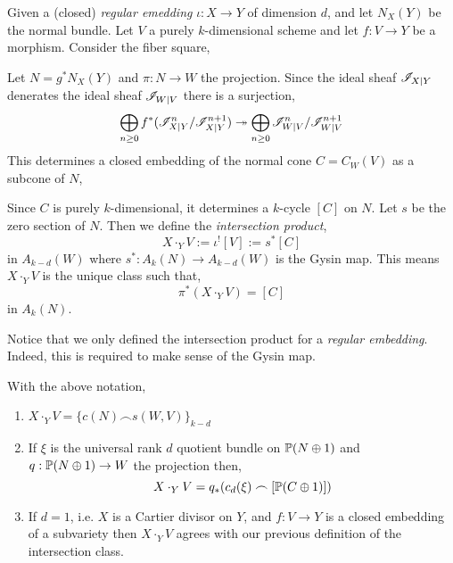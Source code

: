 \documentclass[12pt]{article}
\begin{document}
Given a (closed) \textit{regular emedding} $\iota : X \to Y$ of dimension $d$, and let $N_X(Y)$ be the normal bundle. Let $V$ a purely $k$-dimensional scheme and let $f : V \to Y$ be a morphism. Consider the fiber square,
\begin{center}
\end{center}
Let $N = g^* N_X(Y)$ and $\pi : N \to W$ the projection. Since the ideal sheaf $\I_{X|Y}$ denerates the ideal sheaf $\I_{W | V}$ there is a surjection,
\[ \bigoplus_{n \ge 0} f^* (\I_{X|Y}^n / \I^{n+1}_{X|Y}) \onto \bigoplus_{n \ge 0} \I_{W|V}^n / \I_{W|V}^{n+1} \]
This determines a closed embedding of the normal cone $C = C_W(V)$ as a subcone of $N$,
\begin{center}
\end{center}
Since $C$ is purely $k$-dimensional, it determines a $k$-cycle $[C]$ on $N$. Let $s$ be the zero section of $N$. Then we define the \textit{intersection product},
\[ X \cdot_Y V := \iota^![V] := s^* [C] \]
in $A_{k-d}(W)$ where $s^* : A_k(N) \to A_{k-d}(W)$ is the Gysin map. This means $X \cdot_Y V$ is the unique class such that,
\[ \pi^*(X \cdot_Y V) = [C] \]
in $A_k(N)$.

\begin{rmk}
Notice that we only defined the intersection product for a \textit{regular embedding}. Indeed, this is required to make sense of the Gysin map.
\end{rmk}

\begin{prop}
With the above notation,
\begin{enumerate}
\item $X \cdot_Y V = \{ c(N) \frown s(W, V)\}_{k-d}$
\item If $\xi$ is the universal rank $d$ quotient bundle on $\P(N \oplus 1)$ and $q : \P(N \oplus 1) \to W$ the projection then,
\[ X \cdot_Y V = q_* (c_d(\xi) \frown [\P(C \oplus 1)]) \]
\item If $d = 1$, i.e. $X$ is a Cartier divisor on $Y$, and $f : V \to Y$ is a closed embedding of a subvariety then $X \cdot_Y V$ agrees with our previous definition of the intersection class. 
\end{enumerate}
\end{prop}
\end{document}
